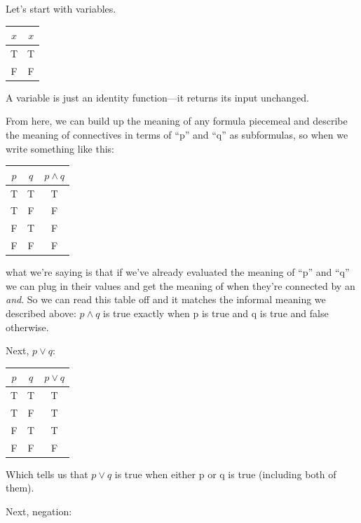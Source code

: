 \documentclass[11pt]{article}
\begin{document}
Let's start with variables.

\begin{center}
\begin{tabular}{cc}
\toprule
$x$ & $x$ \\
\midrule
T & T \\
F & F \\
\bottomrule
\end{tabular}
\end{center}

A variable is just an identity function---it returns its input unchanged.

From here, we can build up the meaning of any formula piecemeal and describe the meaning of connectives in terms of ``p'' and ``q'' as subformulas, so when we write something like this:

\begin{center}
\begin{tabular}{cc|c}
\toprule
$p$ & $q$ & $p \wedge q$ \\
\midrule
T & T & T \\
T & F & F \\
F & T & F \\
F & F & F \\
\bottomrule
\end{tabular}
\end{center}

what we're saying is that if we've already evaluated the meaning of ``p'' and ``q'' we can plug in their values and get the meaning of when they're connected by an \emph{and}. So we can read this table off and it matches the informal meaning we described above: $p \wedge q$ is true exactly when p is true and q is true and false otherwise.

Next, $p \vee q$:

\begin{center}
\begin{tabular}{cc|c}
\toprule
$p$ & $q$ & $p \vee q$ \\
\midrule
T & T & T \\
T & F & T \\
F & T & T \\
F & F & F \\
\bottomrule
\end{tabular}
\end{center}

Which tells us that $p \vee q$ is true when either p or q is true (including both of them).

Next, negation:
\end{document}
